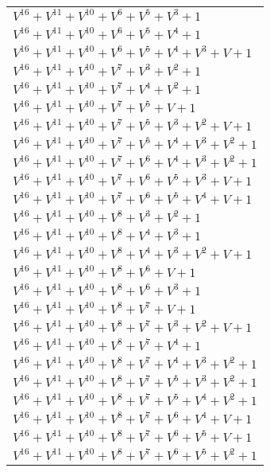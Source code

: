 \documentclass[12pt]{article}
\begin{document}
\begin{adjustwidth}{-4cm}{}
\begin{center}
\begin{longtable}{|l|}
$V^{16}  +V^{11}  +V^{10}  +V^{6}  +V^{5}  +V^{3}  + 1$ \\
$V^{16}  +V^{11}  +V^{10}  +V^{6}  +V^{5}  +V^{4}  + 1$ \\
$V^{16}  +V^{11}  +V^{10}  +V^{6}  +V^{5}  +V^{4}  +V^{3}  + V + 1$ \\
$V^{16}  +V^{11}  +V^{10}  +V^{7}  +V^{3}  +V^{2}  + 1$ \\
$V^{16}  +V^{11}  +V^{10}  +V^{7}  +V^{4}  +V^{2}  + 1$ \\
$V^{16}  +V^{11}  +V^{10}  +V^{7}  +V^{5}  + V + 1$ \\
$V^{16}  +V^{11}  +V^{10}  +V^{7}  +V^{5}  +V^{3}  +V^{2}  + V + 1$ \\
$V^{16}  +V^{11}  +V^{10}  +V^{7}  +V^{5}  +V^{4}  +V^{3}  +V^{2}  + 1$ \\
$V^{16}  +V^{11}  +V^{10}  +V^{7}  +V^{6}  +V^{4}  +V^{3}  +V^{2}  + 1$ \\
$V^{16}  +V^{11}  +V^{10}  +V^{7}  +V^{6}  +V^{5}  +V^{3}  + V + 1$ \\
$V^{16}  +V^{11}  +V^{10}  +V^{7}  +V^{6}  +V^{5}  +V^{4}  + V + 1$ \\
$V^{16}  +V^{11}  +V^{10}  +V^{8}  +V^{3}  +V^{2}  + 1$ \\
$V^{16}  +V^{11}  +V^{10}  +V^{8}  +V^{4}  +V^{3}  + 1$ \\
$V^{16}  +V^{11}  +V^{10}  +V^{8}  +V^{4}  +V^{3}  +V^{2}  + V + 1$ \\
$V^{16}  +V^{11}  +V^{10}  +V^{8}  +V^{6}  + V + 1$ \\
$V^{16}  +V^{11}  +V^{10}  +V^{8}  +V^{6}  +V^{3}  + 1$ \\
$V^{16}  +V^{11}  +V^{10}  +V^{8}  +V^{7}  + V + 1$ \\
$V^{16}  +V^{11}  +V^{10}  +V^{8}  +V^{7}  +V^{3}  +V^{2}  + V + 1$ \\
$V^{16}  +V^{11}  +V^{10}  +V^{8}  +V^{7}  +V^{4}  + 1$ \\
$V^{16}  +V^{11}  +V^{10}  +V^{8}  +V^{7}  +V^{4}  +V^{3}  +V^{2}  + 1$ \\
$V^{16}  +V^{11}  +V^{10}  +V^{8}  +V^{7}  +V^{5}  +V^{3}  +V^{2}  + 1$ \\
$V^{16}  +V^{11}  +V^{10}  +V^{8}  +V^{7}  +V^{5}  +V^{4}  +V^{2}  + 1$ \\
$V^{16}  +V^{11}  +V^{10}  +V^{8}  +V^{7}  +V^{6}  +V^{4}  + V + 1$ \\
$V^{16}  +V^{11}  +V^{10}  +V^{8}  +V^{7}  +V^{6}  +V^{5}  + V + 1$ \\
$V^{16}  +V^{11}  +V^{10}  +V^{8}  +V^{7}  +V^{6}  +V^{5}  +V^{2}  + 1$ \\

\end{longtable}
\end{center}
\end{adjustwidth}
\end{document}
